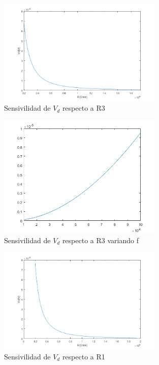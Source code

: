 \documentclass[../../main.tex]{subfiles}
\begin{document}
\begin{figure}[H]	
	\centering
	\includegraphics[width=0.7\textwidth]{fotos/r3r.png}
	\caption{Sensivilidad de $V_d$ respecto a R3}
\end{figure}

\begin{figure}[H]	
	\centering
	\includegraphics[width=0.7\textwidth]{fotos/r3f.png}
	\caption{Sensivilidad de $V_d$ respecto a R3 variando f}
\end{figure}


\begin{figure}[H]	
	\centering
	\includegraphics[width=0.7\textwidth]{fotos/r1r.png}
	\caption{Sensivilidad de $V_d$ respecto a R1}
\end{figure}
\end{document}
